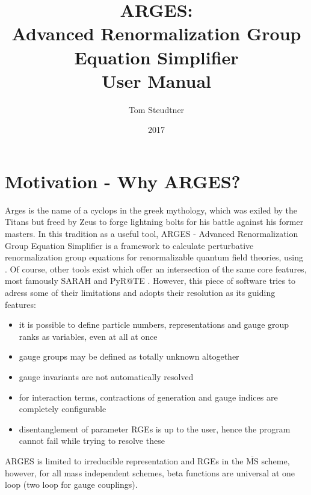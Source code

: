 \documentclass{scrartcl}
\title{ARGES: \\ Advanced Renormalization Group Equation Simplifier \\ User Manual}
\date{2017}
\author{Tom Steudtner}
\begin{document}
\begin{titlepage}
\maketitle
\end{titlepage}
\newpage
\tableofcontents
\thispagestyle{empty}
\newpage
\section{Motivation - Why ARGES?}
Arges is the name of a cyclops in the greek mythology, which was exiled by the Titans but freed by Zeus to forge lightning bolts for his battle against his former masters. \newline
In this tradition as a useful tool, ARGES - Advanced Renormalization Group Equation Simplifier is a framework to calculate perturbative renormalization group equations for renormalizable quantum field theories, using \cite{LuoWangXiao,MV1,MV2,MV3,vev1,vev2,gauge3L,gauge3L2,OsbornJack,OsbornJack2,OsbornJack3,Decoding}. Of course, other tools exist which offer an intersection of the same core features, most famously SARAH \cite{SARAH,SARAH4} and PyR@TE \cite{pyrate,pyrate2}. However, this piece of software tries to adress some of their limitations and adopts their resolution as its guiding features:
\begin{itemize}
\item it is possible to define particle numbers, representations and gauge group ranks as variables, even at all at once
\item gauge groups may be defined as totally unknown altogether
\item gauge invariants are not automatically resolved
\item for interaction terms, contractions of generation and gauge indices are completely configurable
\item disentanglement of parameter RGEs is up to the user, hence the program cannot fail while trying to resolve these
\end{itemize}
ARGES is limited to irreducible representation and RGEs in the $\overline{\mathrm{MS}}$ scheme, however, for all mass independent schemes, beta functions are universal at one loop (two loop for gauge couplings).
\newpage
\end{document}
